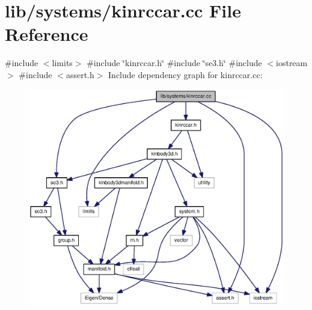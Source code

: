 \section{lib/systems/kinrccar.cc \-File \-Reference}
\label{kinrccar_8cc}
{\ttfamily \#include $<$limits$>$}\*
{\ttfamily \#include \char`\"{}kinrccar.\-h\char`\"{}}\*
{\ttfamily \#include \char`\"{}se3.\-h\char`\"{}}\*
{\ttfamily \#include $<$iostream$>$}\*
{\ttfamily \#include $<$assert.\-h$>$}\*
\-Include dependency graph for kinrccar.\-cc\-:
\nopagebreak
\begin{figure}[H]
\begin{center}
\leavevmode
\includegraphics[width=350pt]{kinrccar_8cc__incl}
\end{center}
\end{figure}
